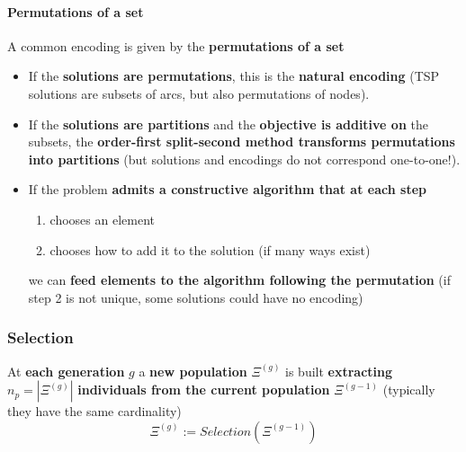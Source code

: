 \documentclass[11pt]{article}
\begin{document}
	\newpage
	
	\paragraph{Permutations of a set}
	
	A common encoding is given by the \textbf{permutations of a set}
	\begin{itemize}
		\item If the \textbf{solutions are permutations}, this is the \textbf{natural encoding} (TSP solutions are subsets of arcs, but also permutations of nodes).\\
		
		\item If the \textbf{solutions are partitions} and the \textbf{objective is additive on} the subsets, the \textbf{order-first split-second method transforms permutations into partitions} (but solutions and encodings do not correspond one-to-one!).\\
		
		\item If the problem \textbf{admits a constructive algorithm that at each step}
		\begin{enumerate}
			\item chooses an element
			\item chooses how to add it to the solution (if many ways exist)
		\end{enumerate}
		we can \textbf{feed elements to the algorithm following the permutation} (if step 2 is not unique, some solutions could have no encoding)
	\end{itemize}
	
	\newpage
	
	\subsubsection{Selection}
	
	At \textbf{each generation} $g$ a \textbf{new population} $\Xi^{(g)}$ is built \textbf{extracting} $n_p = |\Xi^{(g )}|$ \textbf{individuals from the current population} $\Xi^{(g-1)}$ (typically they have the same cardinality)
	$$ \Xi^{(g )} := Selection(\Xi^{(g −1)}) $$
	
\end{document}
